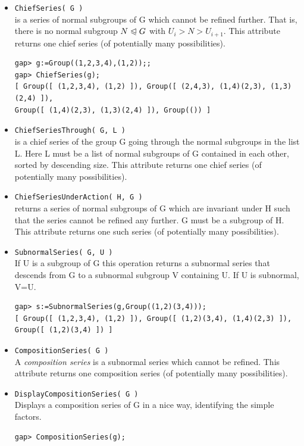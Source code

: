 \begin{itemize}
\item {\tt ChiefSeries( G )}\\[2pt] 
is a series of normal subgroups of G which cannot be refined further. That is, there
is no normal subgroup $N \trianglelefteqslant G$ with $U_i > N > U_{i+1}$. 
This attribute returns one chief series (of potentially many possibilities). %
{\codesize
\begin{verbatim}
gap> g:=Group((1,2,3,4),(1,2));;
gap> ChiefSeries(g);
[ Group([ (1,2,3,4), (1,2) ]), Group([ (2,4,3), (1,4)(2,3), (1,3)(2,4) ]),
Group([ (1,4)(2,3), (1,3)(2,4) ]), Group(()) ]
\end{verbatim}}
\item {\tt ChiefSeriesThrough( G, L )}\\[2pt] 
is a chief series of the group G going through the normal subgroups in the list L. Here
L must be a list of normal subgroups of G contained in each other, sorted by
descending size. This attribute returns one chief series (of potentially many possibilities).
\item {\tt ChiefSeriesUnderAction( H, G )}\\[2pt] 
returns a series of normal subgroups of G which are invariant under H such that the series cannot be
refined any further. G must be a subgroup of H. This attribute returns one such series (of potentially many
possibilities).
\item {\tt SubnormalSeries( G, U )}\\[2pt] 
If U is a subgroup of G this operation returns a subnormal series that descends from G to a subnormal
subgroup V containing U.  If U is subnormal, V=U.  %
{\codesize
\begin{verbatim}
gap> s:=SubnormalSeries(g,Group((1,2)(3,4)));
[ Group([ (1,2,3,4), (1,2) ]), Group([ (1,2)(3,4), (1,4)(2,3) ]),
Group([ (1,2)(3,4) ]) ]
\end{verbatim}}
\item {\tt CompositionSeries( G )}\\[2pt] 
A \emph{composition series} is a subnormal series which cannot be refined. This attribute returns one composition
series (of potentially many possibilities).
\item {\tt DisplayCompositionSeries( G )}\\[2pt] 
Displays a composition series of G in a nice way, identifying the simple factors.
{\codesize
\begin{verbatim}
gap> CompositionSeries(g);

\end{verbatim}}
\end{itemize}
